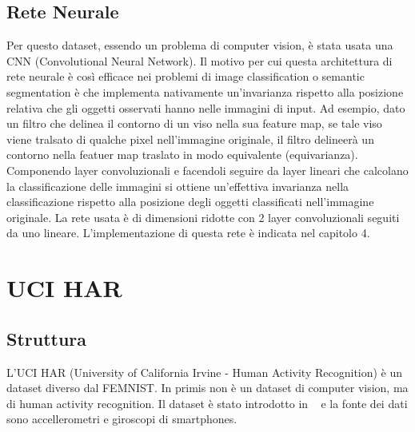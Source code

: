 \subsection{Rete Neurale}
Per questo dataset, essendo un problema di computer vision, è stata
usata una CNN (Convolutional Neural Network). Il motivo per cui questa 
architettura di rete neurale è così efficace nei problemi di image 
classification o semantic segmentation è che implementa nativamente 
un'invarianza rispetto alla posizione relativa che gli oggetti 
osservati hanno nelle immagini 
di input. Ad esempio, dato un filtro che delinea il contorno di un 
viso nella sua feature map, se tale viso viene tralsato di qualche 
pixel nell'immagine originale, il filtro delineerà un contorno nella 
featuer map traslato in modo equivalente (equivarianza). Componendo 
layer convoluzionali e facendoli seguire da layer lineari che calcolano 
la classificazione delle immagini si ottiene un'effettiva invarianza 
nella classificazione rispetto alla posizione degli oggetti classificati 
nell'immagine originale. La rete usata è di dimensioni ridotte con 2 
layer convoluzionali seguiti da uno lineare. L'implementazione di questa 
rete è indicata nel capitolo 4.


\section{UCI HAR}
\subsection{Struttura}
L'UCI HAR (University of California Irvine -
Human Activity Recognition) è un dataset diverso dal FEMNIST. In primis
non è un dataset di computer vision, ma di human activity recognition.
Il dataset è stato introdotto in ~\cite{Anguita2013APD} e la fonte dei
dati sono accellerometri e giroscopi di smartphones.

